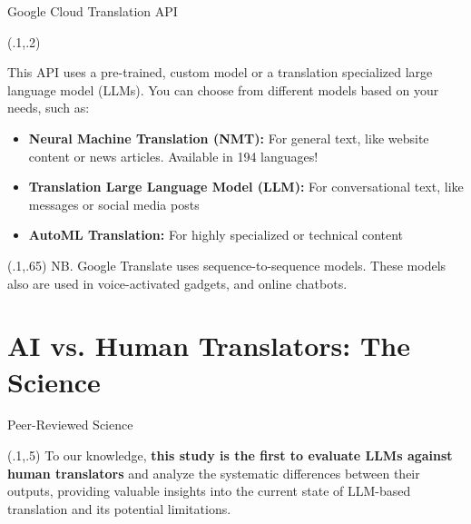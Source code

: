 \documentclass{beamer}
\begin{document}
\begin{frame}{Google Cloud Translation API}

\begin{textblock}{1}(.1,.2)
  \footnotesize {This API uses a pre-trained, custom model or a translation specialized large language model (LLMs). You can choose from different models based on your needs, such as: 
\begin{itemize}
  \item \textbf{Neural Machine Translation (NMT):} For general text, like website content or news articles. Available in 194 languages! 
  \item \textbf{Translation Large Language Model (LLM):} For conversational text, like messages or social media posts 
  \item \textbf{AutoML Translation:} For highly specialized or technical content
\end{itemize}
}
\end{textblock}


\begin{textblock}{1}(.1,.65)
  \tiny{NB. Google Translate uses sequence-to-sequence models. These models also are used in voice-activated gadgets, and online chatbots.}
\end{textblock}


\end{frame}


\section{AI vs. Human Translators: The Science}

\begin{frame}{Peer-Reviewed Science}

 
 
 \begin{textblock}{1}(.1,.5)
  \small {To our knowledge, \textbf{this study is the first to evaluate LLMs against human translators} and analyze the systematic differences between their outputs, providing valuable insights into the current state of LLM-based translation and its potential limitations.}
\end{textblock}
 
\end{frame}
\end{document}
